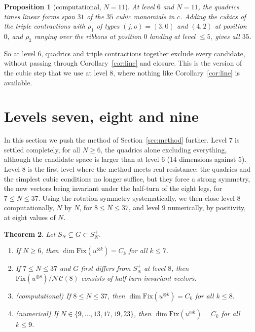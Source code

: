 \documentclass[11pt]{amsart}
\newtheorem{theorem}{Theorem}[section]
\newtheorem{proposition}[theorem]{Proposition}
\theoremstyle{definition}
\theoremstyle{remark}
\theoremstyle{plain}
\numberwithin{equation}{section}
\numberwithin{table}{section}
\newcommand{\Fix}{\mathrm{Fix}}
\newcommand{\NC}{\mathcal{NC}}
\begin{document}
\begin{proposition}[computational, $N=11$]\label{prop:triplesix}
At level $6$ and $N=11$, the quadrics times linear forms span $31$ of the $35$ cubic monomials in $c$. Adding the cubics of the triple contractions with $\rho_1$ of types $(j,o)=(3,0)$ and $(4,2)$ at position $0$, and $\rho_2$ ranging over the ribbons at position $0$ landing at level $\le5$, gives all $35$.
\end{proposition}

So at level $6$, quadrics and triple contractions together exclude every candidate, without passing through Corollary~\ref{cor:line} and closure. This is the version of the cubic step that we use at level $8$, where nothing like Corollary~\ref{cor:line} is available.



\section{Levels seven, eight and nine}\label{sec:higher}

In this section we push the method of Section~\ref{sec:method} further. Level $7$ is settled completely, for all $N\ge6$, the quadrics alone excluding everything, although the candidate space is larger than at level $6$ ($14$ dimensions against $5$). Level $8$ is the first level where the method meets real resistance: the quadrics and the simplest cubic conditions no longer suffice, but they force a strong symmetry, the new vectors being invariant under the half-turn of the eight legs, for $7\le N\le37$. Using the rotation symmetry systematically, we then close level $8$ computationally, $N$ by $N$, for $8\le N\le37$, and level $9$ numerically, by positivity, at eight values of $N$.

\begin{theorem}\label{thm:main}
Let $S_N\subsetneq G\subset S_N^+$.
\begin{enumerate}
\item If $N\ge6$, then $\dim\Fix(u^{\otimes k})=C_k$ for all $k\le7$.
\item If $7\le N\le37$ and $G$ first differs from $S_N^+$ at level $8$, then $\Fix(u^{\otimes8})/\NC(8)$ consists of half-turn-invariant vectors.
\item \emph{(computational)} If $8\le N\le37$, then $\dim\Fix(u^{\otimes k})=C_k$ for all $k\le8$.
\item \emph{(numerical)} If $N\in\{9,\dots,13,17,19,23\}$, then $\dim\Fix(u^{\otimes k})=C_k$ for all $k\le9$.
\end{enumerate}
\end{theorem}
\end{document}

